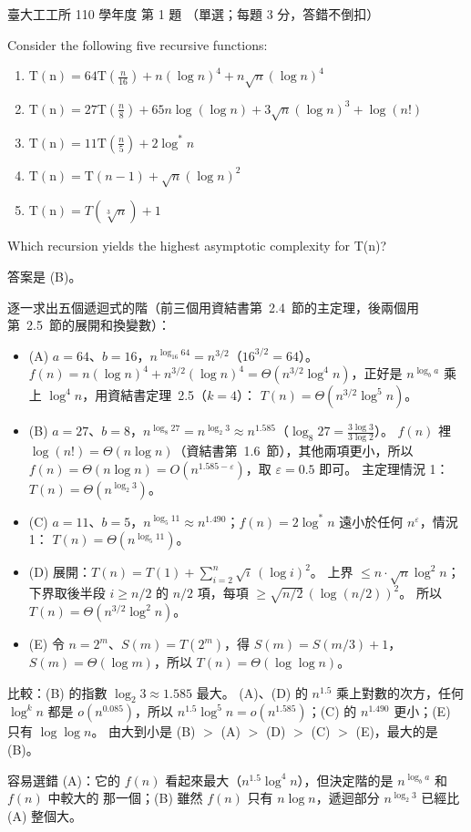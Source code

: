 \begin{pastexam}[label={px:ntu-110-ie-ds-01}]{臺大工工所 110 學年度 第 1 題}
（單選；每題 3 分，答錯不倒扣）

Consider the following five recursive functions:
\begin{enumerate}[label=(\Alph*)]
\item $\mathrm{T(n)}=64\mathrm{T}\left(\frac{n}{16}\right)+n(\log n)^4+n\sqrt{n}(\log n)^4$
\item $\mathrm{T(n)}=27\mathrm{T}\left(\frac{n}{8}\right)+65n\log(\log n)+3\sqrt{n}(\log n)^3+\log(n!)$
\item $\mathrm{T(n)}=11\mathrm{T}\left(\frac{n}{5}\right)+2\log^* n$
\item $\mathrm{T(n)}=\mathrm{T}(n-1)+\sqrt{n}(\log n)^2$
\item $\mathrm{T(n)}=T(\sqrt[3]{n})+1$
\end{enumerate}
Which recursion yields the highest asymptotic complexity for T(n)?
\end{pastexam}

\begin{pastsoln}
答案是 (B)。

逐一求出五個遞迴式的階（前三個用資結書第~2.4~節的主定理，後兩個用第~2.5~節的展開和換變數）：
\begin{itemize}
\item (A) $a = 64$、$b = 16$，$n^{\log_{16} 64} = n^{3/2}$（$16^{3/2} = 64$）。 $f(n) = n(\log n)^4 + n^{3/2}(\log n)^4
= \Theta(n^{3/2}\log^4 n)$，正好是 $n^{\log_b a}$ 乘上 $\log^4 n$，用資結書定理~2.5（$k = 4$）：
$T(n) = \Theta(n^{3/2}\log^5 n)$。
\item (B) $a = 27$、$b = 8$，$n^{\log_8 27} = n^{\log_2 3} \approx n^{1.585}$（$\log_8 27 = \frac{3\log 3}{3\log 2}$）。
$f(n)$ 裡 $\log(n!) = \Theta(n \log n)$（資結書第~1.6~節），其他兩項更小，所以 $f(n) = \Theta(n \log n)
= O(n^{1.585 - \varepsilon})$，取 $\varepsilon = 0.5$ 即可。 主定理情況 1：$T(n) = \Theta(n^{\log_2 3})$。
\item (C) $a = 11$、$b = 5$，$n^{\log_5 11} \approx n^{1.490}$；$f(n) = 2\log^* n$ 遠小於任何 $n^{\varepsilon}$，情況 1：
$T(n) = \Theta(n^{\log_5 11})$。
\item (D) 展開：$T(n) = T(1) + \sum_{i=2}^{n} \sqrt{i}\,(\log i)^2$。 上界 $\le n \cdot \sqrt n \log^2 n$；下界取後半段
$i \ge n/2$ 的 $n/2$ 項，每項 $\ge \sqrt{n/2}\,(\log (n/2))^2$。 所以 $T(n) = \Theta(n^{3/2}\log^2 n)$。
\item (E) 令 $n = 2^m$、$S(m) = T(2^m)$，得 $S(m) = S(m/3) + 1$，$S(m) = \Theta(\log m)$，所以
$T(n) = \Theta(\log\log n)$。
\end{itemize}

比較：(B) 的指數 $\log_2 3 \approx 1.585$ 最大。 (A)、(D) 的 $n^{1.5}$ 乘上對數的次方，任何
$\log^k n$ 都是 $o(n^{0.085})$，所以 $n^{1.5}\log^5 n = o(n^{1.585})$；(C) 的 $n^{1.490}$ 更小；(E) 只有
$\log\log n$。 由大到小是 (B) $>$ (A) $>$ (D) $>$ (C) $>$ (E)，最大的是 (B)。

容易選錯 (A)：它的 $f(n)$ 看起來最大（$n^{1.5}\log^4 n$），但決定階的是 $n^{\log_b a}$ 和 $f(n)$ 中較大的
那一個；(B) 雖然 $f(n)$ 只有 $n \log n$，遞迴部分 $n^{\log_2 3}$ 已經比 (A) 整個大。
\end{pastsoln}
